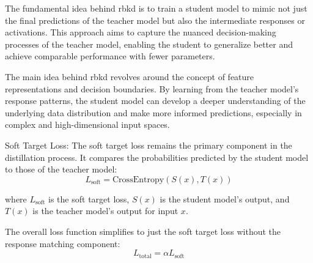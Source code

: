 \documentclass{ioereport}
\begin{document}
    The fundamental idea behind \gls{rbkd} is to train a student model to mimic not just the final predictions of the teacher model but also the intermediate responses or activations. This approach aims to capture the nuanced decision-making processes of the teacher model, enabling the student to generalize better and achieve comparable performance with fewer parameters.
    
    The main idea behind \gls{rbkd} revolves around the concept of feature representations and decision boundaries. By learning from the teacher model's response patterns, the student model can develop a deeper understanding of the underlying data distribution and make more informed predictions, especially in complex and high-dimensional input spaces.
    
    
    Soft Target Loss:
    The soft target loss remains the primary component in the distillation process. It compares the probabilities predicted by the student model to those of the teacher model:
    \begin{equation}
        L_{\text{soft}} = \text{CrossEntropy}(S(x), T(x))
    \end{equation}
    
    where $L_{\text{soft}}$ is the soft target loss, $S(x)$ is the student model's output, and $T(x)$ is the teacher model's output for input $x$.
    
    The overall loss function simplifies to just the soft target loss without the response matching component:
    \begin{equation}
        L_{\text{total}} = \alpha L_{\text{soft}}
    \end{equation}
\end{document}
